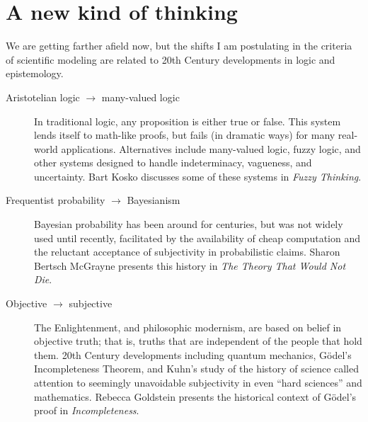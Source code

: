 \documentclass[10pt]{book}
\begin{document}
\section{A new kind of thinking}

We are getting farther afield now, but the shifts I am postulating
in the criteria of scientific modeling are related to 20th Century
developments in logic and epistemology.

\begin{description}

\item[Aristotelian logic $\rightarrow$ many-valued logic] In
  traditional logic, any proposition is either true or false.  This
  system lends itself to math-like proofs, but fails (in dramatic
  ways) for many real-world applications.  Alternatives include
  many-valued logic, fuzzy logic, and other systems designed to handle
  indeterminacy, vagueness, and uncertainty.  Bart
  Kosko discusses some of these systems in {\em Fuzzy
    Thinking}.

\item[Frequentist probability $\rightarrow$ Bayesianism] Bayesian
  probability has been around for centuries, but was not widely used
  until recently, facilitated by the availability of cheap computation
  and the reluctant acceptance of subjectivity
  in probabilistic claims.  Sharon Bertsch McGrayne presents this
  history in {\em The Theory That Would Not Die}.

\item[Objective $\rightarrow$ subjective] The Enlightenment, and
  philosophic modernism, are based on belief in objective truth; that
  is, truths that are independent of the people that hold them.  20th
  Century developments including quantum mechanics, G\"{o}del's
  Incompleteness Theorem, and Kuhn's study of the history of science
  called attention to seemingly unavoidable subjectivity in
  even ``hard sciences'' and mathematics.  Rebecca Goldstein presents
  the historical context of G\"{o}del's proof in {\it Incompleteness}.


\end{description}
\end{document}
